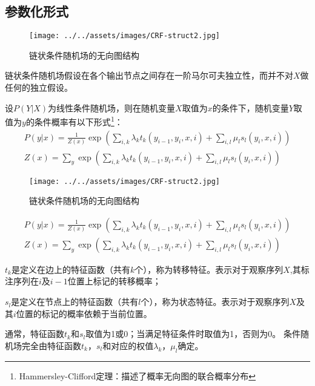 \documentclass[9pt,aspectratio=169]{ctexbeamer}
\begin{document}
	\subsection{参数化形式}
	\begin{frame}

	

		\begin{figure}
			\centering
			\texttt{[image: ../../assets/images/CRF-struct2.jpg]}
			\caption{链状条件随机场的无向图结构}
		\end{figure}
	
		链状条件随机场假设在各个输出节点之间存在一阶马尔可夫独立性，而并不对$X$做任何的独立假设。
		
		设$P(Y|X)$为线性条件随机场，则在随机变量$X$取值为$x$的条件下，随机变量$Y$取值为$y$的条件概率有以下形式\footnote{Hammersley-Clifford定理：描述了概率无向图的联合概率分布}：
		\begin{gather}
			P(y|x) = \frac{1}{Z(x)}\exp\left(\sum_{i,k}\lambda_{k}t_{k}\left(y_{i-1},y_{i},x,i\right)+\sum_{i,l}\mu_ls_l\left(y_{i},x,i\right)\right) \\
			Z({x}) = \sum_y\exp\left(\sum_{i,k}\lambda_{k}t_{k}\left(y_{i-1},y_{i},x,i\right)+\sum_{i,l}\mu_ls_l\left(y_{i},x,i\right)\right)
		\end{gather}
	\end{frame}
	
	\begin{frame}
		\begin{figure}
			\centering
			\texttt{[image: ../../assets/images/CRF-struct2.jpg]}
			\caption{链状条件随机场的无向图结构}
		\end{figure}
		\begin{gather*}
		P(y|x) = \frac{1}{Z(x)}\exp\left(\sum_{i,k}\lambda_{k}t_{k}\left(y_{i-1},y_{i},x,i\right)+\sum_{i,l}\mu_ls_l\left(y_{i},x,i\right)\right) \\
		Z({x}) = \sum_y\exp\left(\sum_{i,k}\lambda_{k}t_{k}\left(y_{i-1},y_{i},x,i\right)+\sum_{i,l}\mu_ls_l\left(y_{i},x,i\right)\right)
		\end{gather*}
		
		$ t_{k} $是定义在边上的特征函数（共有$ k $个），称为转移特征。表示对于观察序列$ X $,其标注序列在$ i $及$ i-1 $位置上标记的转移概率；
		
		$ s_{l} $是定义在节点上的特征函数（共有$ l $个），称为状态特征。表示对于观察序列$ X $及其$ i $位置的标记的概率依赖于当前位置。
		
		通常，特征函数$t_{k}$和$s_{l}$取值为1或0；当满足特征条件时取值为1，否则为0。
		条件随机场完全由特征函数$t_{k}$，$s_{l}$和对应的权值$\lambda_{k}$，$\mu_{l}$确定。
	\end{frame}
\end{document}
